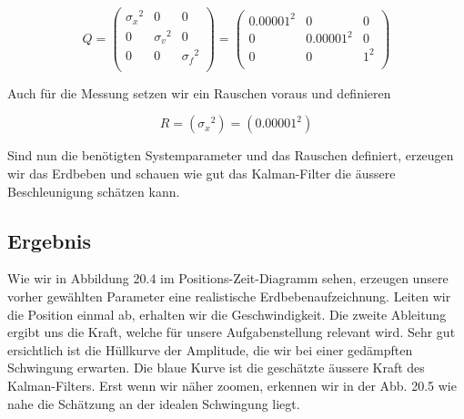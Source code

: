 \begin{equation}
	Q = \left(
	\begin{array}{ccc} 	
		{\sigma_x }^2& 0& 0 \\ 
		0 & {\sigma_v }^2& 0\\ 
		0 & 0& {\sigma_f }^2\\
	\end{array}\right)= \left(
	\begin{array}{ccc} 	
		{0.00001 }^2& 0& 0 \\ 
		0 & {0.00001 }^2& 0\\ 
		0 & 0& {1 }^2\\
	\end{array}\right)
\end{equation} 

Auch für die Messung setzen wir ein Rauschen voraus und definieren

\begin{equation}
R= ({\sigma_x}^2)=
({0.00001}^2)
\end{equation}

Sind nun die benötigten Systemparameter und das Rauschen definiert, erzeugen wir das Erdbeben und schauen wie gut das Kalman-Filter die äussere Beschleunigung schätzen kann.

\subsection*{Ergebnis}

Wie wir in Abbildung 20.4 im Positions-Zeit-Diagramm sehen, erzeugen unsere vorher gewählten Parameter eine realistische Erdbebenaufzeichnung.
Leiten wir die Position einmal ab, erhalten wir die Geschwindigkeit.
Die zweite Ableitung ergibt uns die Kraft, welche für unsere Aufgabenstellung relevant wird.
Sehr gut ersichtlich ist die Hüllkurve der Amplitude, die wir bei einer gedämpften Schwingung erwarten.
Die blaue Kurve ist die geschätzte äussere Kraft des Kalman-Filters.
Erst wenn wir näher zoomen, erkennen wir in der Abb. 20.5 wie nahe die Schätzung an der idealen Schwingung liegt.

